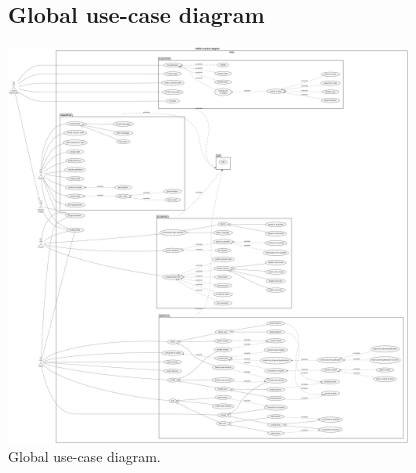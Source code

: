 \documentclass[]{uc2pfecaneva}
\begin{document}
    \begin{figure}[ht]
        \subsection{Global use-case diagram}
        \centering
        \includegraphics[width=300pt]{images/GUCD}

        \caption{Global use-case diagram.}
    \end{figure}
    \clearpage
\end{document}
